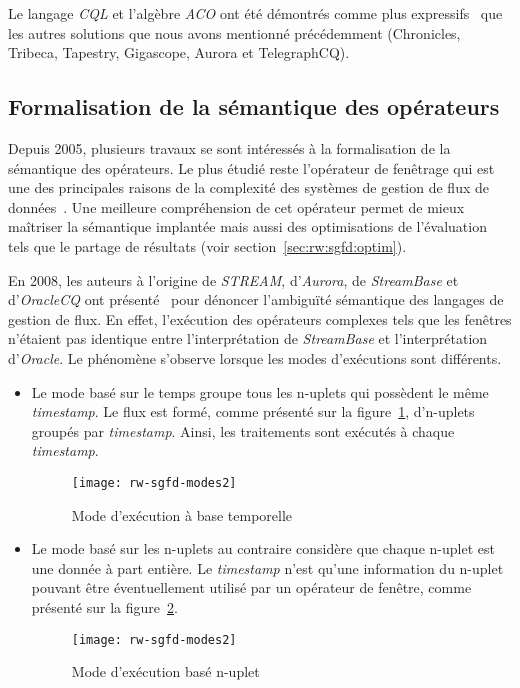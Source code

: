 Le langage \textit{CQL} et l'algèbre \textit{ACO} ont été démontrés comme plus expressifs~\cite{Arasu:cql} que les autres solutions que nous avons mentionné précédemment (Chronicles, Tribeca, Tapestry, Gigascope, Aurora et TelegraphCQ).

\subsection{Formalisation de la sémantique des opérateurs}\label{sec:rw:sgfd:modeles:batch}
Depuis 2005, plusieurs travaux se sont intéressés à la formalisation de la sémantique des opérateurs. Le plus étudié reste l'opérateur de fenêtrage qui est une des principales raisons de la complexité des systèmes de gestion de flux de données~\cite{Maier:semantics,Patroumpas:window,Patroumpas:subsumewindows}. Une meilleure compréhension de cet opérateur permet de mieux maîtriser la sémantique implantée mais aussi des optimisations de l'évaluation tels que le partage de résultats (voir section~\ref{sec:rw:sgfd:optim}).

En 2008, les auteurs à l'origine de \textit{STREAM}, d'\textit{Aurora}, de \textit{StreamBase} et d'\textit{OracleCQ} ont présenté~\cite{Jain:spread} pour dénoncer l'ambiguïté sémantique des langages de gestion de flux. En effet, l'exécution des opérateurs complexes tels que les fenêtres n'étaient pas identique entre l'interprétation de \textit{StreamBase} et l'interprétation d'\textit{Oracle}. Le phénomène s'observe lorsque les modes d'exécutions sont différents.
\begin{itemize}
	\item Le mode basé sur le temps groupe tous les n-uplets qui possèdent le même \textit{timestamp}. Le flux est formé, comme présenté sur la figure~\ref{fig:rw:sgfd:mode:time}, d'n-uplets groupés par \textit{timestamp}. Ainsi, les traitements sont exécutés à chaque \textit{timestamp}.
	\begin{figure}[ht]
		\centering
		\texttt{[image: rw-sgfd-modes2]}
		\caption{Mode d'exécution à base temporelle}\label{fig:rw:sgfd:mode:time}
	\end{figure}
	\item Le mode basé sur les n-uplets au contraire considère que chaque n-uplet est une donnée à part entière. Le \textit{timestamp} n'est qu'une information du n-uplet pouvant être éventuellement utilisé par un opérateur de fenêtre, comme présenté sur la figure~\ref{fig:rw:sgfd:mode:tuple}.
	\begin{figure}[ht]
		\centering
		\texttt{[image: rw-sgfd-modes2]}
		\caption{Mode d'exécution basé n-uplet}\label{fig:rw:sgfd:mode:tuple}
	\end{figure}
\end{itemize}

